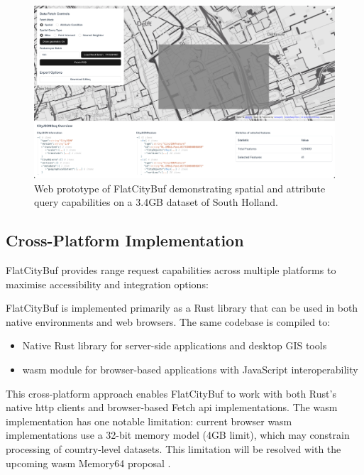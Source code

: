 \begin{figure}[ht]
  \centering
  \includegraphics[width=1.0\textwidth]{figs/result_analysis/web_prototype.png}
  \caption{Web prototype of FlatCityBuf demonstrating spatial and attribute query capabilities on a 3.4GB dataset of South Holland.}
  \label{fig:result:cross_platform_implementation:web_prototype}
\end{figure}

\subsection{Cross-Platform Implementation}
\label{result:cross_platform_implementation}

FlatCityBuf provides range request capabilities across multiple platforms to maximise accessibility and integration options:

FlatCityBuf is implemented primarily as a Rust library that can be used in both native environments and web browsers. The same codebase is compiled to:

\begin{itemize}
  \item Native Rust library for server-side applications and desktop GIS tools
  \item \ac{wasm} module for browser-based applications with JavaScript interoperability
\end{itemize}

This cross-platform approach enables FlatCityBuf to work with both Rust's native \ac{http} clients and browser-based Fetch \ac{api} implementations. The \ac{wasm} implementation has one notable limitation: current browser \ac{wasm} implementations use a 32-bit memory model (4GB limit), which may constrain processing of country-level datasets. This limitation will be resolved with the upcoming \ac{wasm} Memory64 proposal \citep{WebAssemblyCoreSpecification2}.

